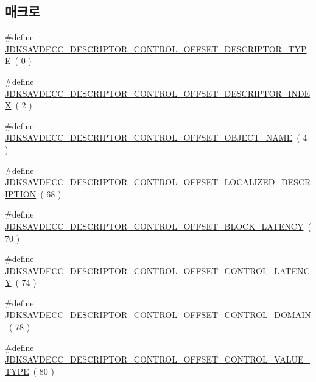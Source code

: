 \subsection*{매크로}
\begin{DoxyCompactItemize}
\item 
\#define \hyperlink{group__descriptor__control_gab2638dd46f1c72775b22423487f7a878}{J\+D\+K\+S\+A\+V\+D\+E\+C\+C\+\_\+\+D\+E\+S\+C\+R\+I\+P\+T\+O\+R\+\_\+\+C\+O\+N\+T\+R\+O\+L\+\_\+\+O\+F\+F\+S\+E\+T\+\_\+\+D\+E\+S\+C\+R\+I\+P\+T\+O\+R\+\_\+\+T\+Y\+PE}~( 0 )
\item 
\#define \hyperlink{group__descriptor__control_gabf973212dd7cd74976ecc0ca69165149}{J\+D\+K\+S\+A\+V\+D\+E\+C\+C\+\_\+\+D\+E\+S\+C\+R\+I\+P\+T\+O\+R\+\_\+\+C\+O\+N\+T\+R\+O\+L\+\_\+\+O\+F\+F\+S\+E\+T\+\_\+\+D\+E\+S\+C\+R\+I\+P\+T\+O\+R\+\_\+\+I\+N\+D\+EX}~( 2 )
\item 
\#define \hyperlink{group__descriptor__control_ga126ef2ef0b584aeaab43f6c37cad68f0}{J\+D\+K\+S\+A\+V\+D\+E\+C\+C\+\_\+\+D\+E\+S\+C\+R\+I\+P\+T\+O\+R\+\_\+\+C\+O\+N\+T\+R\+O\+L\+\_\+\+O\+F\+F\+S\+E\+T\+\_\+\+O\+B\+J\+E\+C\+T\+\_\+\+N\+A\+ME}~( 4 )
\item 
\#define \hyperlink{group__descriptor__control_ga89c7e79d9de6538a2bc5fd08eb0d9356}{J\+D\+K\+S\+A\+V\+D\+E\+C\+C\+\_\+\+D\+E\+S\+C\+R\+I\+P\+T\+O\+R\+\_\+\+C\+O\+N\+T\+R\+O\+L\+\_\+\+O\+F\+F\+S\+E\+T\+\_\+\+L\+O\+C\+A\+L\+I\+Z\+E\+D\+\_\+\+D\+E\+S\+C\+R\+I\+P\+T\+I\+ON}~( 68 )
\item 
\#define \hyperlink{group__descriptor__control_gabb678c0104ddf1fb7fb7d820696183aa}{J\+D\+K\+S\+A\+V\+D\+E\+C\+C\+\_\+\+D\+E\+S\+C\+R\+I\+P\+T\+O\+R\+\_\+\+C\+O\+N\+T\+R\+O\+L\+\_\+\+O\+F\+F\+S\+E\+T\+\_\+\+B\+L\+O\+C\+K\+\_\+\+L\+A\+T\+E\+N\+CY}~( 70 )
\item 
\#define \hyperlink{group__descriptor__control_gad65ac48aac959952cb034060d7743e7c}{J\+D\+K\+S\+A\+V\+D\+E\+C\+C\+\_\+\+D\+E\+S\+C\+R\+I\+P\+T\+O\+R\+\_\+\+C\+O\+N\+T\+R\+O\+L\+\_\+\+O\+F\+F\+S\+E\+T\+\_\+\+C\+O\+N\+T\+R\+O\+L\+\_\+\+L\+A\+T\+E\+N\+CY}~( 74 )
\item 
\#define \hyperlink{group__descriptor__control_ga4b283275da4eaebf7dce5ee3ef23e290}{J\+D\+K\+S\+A\+V\+D\+E\+C\+C\+\_\+\+D\+E\+S\+C\+R\+I\+P\+T\+O\+R\+\_\+\+C\+O\+N\+T\+R\+O\+L\+\_\+\+O\+F\+F\+S\+E\+T\+\_\+\+C\+O\+N\+T\+R\+O\+L\+\_\+\+D\+O\+M\+A\+IN}~( 78 )
\item 
\#define \hyperlink{group__descriptor__control_gad1a3f0be1b493dd4a753da66c9908b0c}{J\+D\+K\+S\+A\+V\+D\+E\+C\+C\+\_\+\+D\+E\+S\+C\+R\+I\+P\+T\+O\+R\+\_\+\+C\+O\+N\+T\+R\+O\+L\+\_\+\+O\+F\+F\+S\+E\+T\+\_\+\+C\+O\+N\+T\+R\+O\+L\+\_\+\+V\+A\+L\+U\+E\+\_\+\+T\+Y\+PE}~( 80 )

\end{DoxyCompactItemize}
